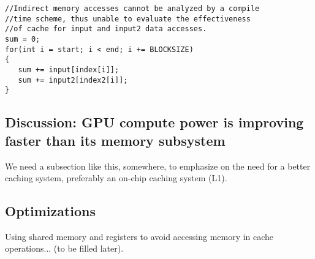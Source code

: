 {\footnotesize
\begin{verbatim}
//Indirect memory accesses cannot be analyzed by a compile 
//time scheme, thus unable to evaluate the effectiveness 
//of cache for input and input2 data accesses.
sum = 0;
for(int i = start; i < end; i += BLOCKSIZE)
{
   sum += input[index[i]];
   sum += input2[index2[i]];
}
\end{verbatim}
}


\subsection{Discussion: GPU compute power is improving faster than its memory subsystem}

We need a subsection like this, somewhere, to emphasize on the need for a better caching system, preferably an on-chip
caching system (L1).

\subsection{Optimizations}

Using shared memory and registers to avoid accessing memory in cache operations... (to be filled later).\cite{nicepaper3}


%


